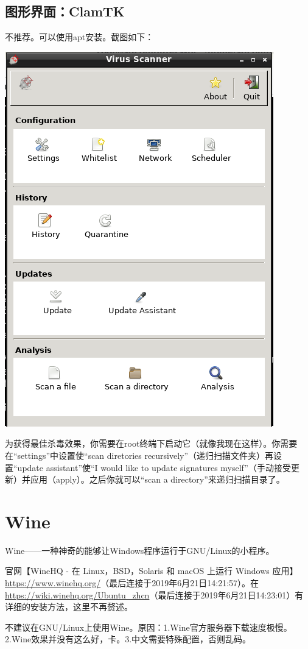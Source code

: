 \subsection{图形界面：ClamTK}
不推荐。可以使用apt安装。截图如下：
\begin{center}
	\includegraphics[scale=0.5]{pic/ctk}
\end{center} \par
为获得最佳杀毒效果，你需要在root终端下启动它（就像我现在这样）。你需要在“settings”中设置使“scan diretories recursively”（递归扫描文件夹）再设置“update assistant”使“I would like to update signatures myself”（手动接受更新）并应用（apply）。之后你就可以“scan a directory”来递归扫描目录了。
\section{Wine}
Wine——一种神奇的能够让Windows程序运行于GNU/Linux的小程序。\par
官网【WineHQ - 在 Linux，BSD，Solaris 和 macOS 上运行 Windows 应用】\url{https://www.winehq.org/}（最后连接于2019年6月21日14:21:57）。在\url{https://wiki.winehq.org/Ubuntu_zhcn}（最后连接于2019年6月21日14:23:01）有详细的安装方法，这里不再赘述。\par
不建议在GNU/Linux上使用Wine。原因：1.Wine官方服务器下载速度极慢。2.Wine效果并没有这么好，卡。3.中文需要特殊配置，否则乱码。
